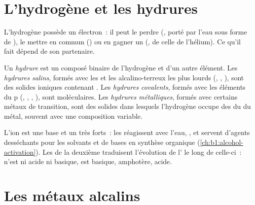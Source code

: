 \section{L'hydrogène et les hydrures}

L'hydrogène possède un électron~: il peut le perdre (, porté par
l'eau sous forme de ), le mettre en commun () ou en gagner un (, de 
celle de l'hélium). Ce qu'il fait dépend de son partenaire.

\begin{definition}[Hydrures]\label{def:b1:s-block:hydride}
Un \emph{hydrure} est un composé binaire de l'hydrogène
et d'un autre élément. Les \emph{hydrures salins},
formés avec les  et les alcalino-terreux les plus lourds
(, , ), sont des solides ioniques contenant
. Les \emph{hydrures covalents}, formés
avec les éléments du  p (, , , ),
sont moléculaires. Les \emph{hydrures
métalliques}, formés avec
certains métaux de transition, sont des solides dans lesquels
l'hydrogène occupe des  du  du métal, souvent
avec une composition variable.
\end{definition}

L'ion  est une base et un  très forts~: les  réagissent avec l'eau, , et servent
d'agents desséchants pour les solvants et de bases en synthèse
organique (\cref{ch:b1:alcohol-activation}).
Les  de la deuxième  traduisent l'évolution de
l' le long de celle-ci~:  n'est ni acide ni
basique,  est basique,  amphotère,  acide.

\section{Les métaux alcalins}

